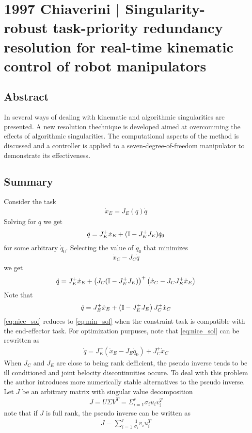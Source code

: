 \section{1997 Chiaverini | Singularity-robust task-priority redundancy resolution for real-time kinematic control of robot
manipulators}

\cite{chiaverini1997} 

\subsection{Abstract}

In \cite{chiaverini1997} several ways of dealing with kinematic and algorithmic singularities are presented. A new resolution thechnique is developed aimed at overcomming the effects of algorithmic singularities. The computational aspects of the method is discussed and a controller is applied to a seven-degree-of-freedom manipulator to demonstrate its effectiveness.

\subsection{Summary}

Consider the task
\begin{align}
    \dot x_E = J_E(q) \dot q
\end{align}
Solving for $q$ we get
\begin{align}
    \dot q = J_E^+ \dot x_E + (\mathbb{I} - J_E^+J_E)\dot q_0
\end{align}
for some arbitrary $\dot q_0$. Selecting the value of $\dot q_0$ that minimizes
\begin{align}
    \dot x_C - J_C \dot q
\end{align}
we get
\begin{align}
    \dot q = J_E^+ \dot x_E + \left(J_C(\mathbb{I} - J_E^+J_E)\right)^+ \left(\dot x_C - J_C J_E^+ \dot x_E\right) \label{eq:min_sol}
\end{align}
Note that
\begin{align}
    \dot q = J_E^+ \dot x_E + \left(\mathbb{I} - J_E^+J_E\right)J_C^+ \dot x_C \label{eq:nice_sol}
\end{align}
\autoref{eq:nice_sol} reduces to \autoref{eq:min_sol} when the constraint task is compatible with the end-effector task. For optimization purpuses, note that \autoref{eq:nice_sol} can be rewritten as
\begin{align}
    \dot q = J_E^+\left(\dot x_E - J_E \dot q_0\right) + J_C^+ \dot x_C
\end{align}
When $J_C$ and $J_E$ are close to being rank defficient, the pseudo inverse tends to be ill conditioned and joint belocity discontinuities occure. To deal with this problem the author introduces more numerically stable alternatives to the pseudo inverse. Let $J$ be an arbitrary matrix with singular value decomposition
\begin{align}
    J = U \Sigma V^T = \Sigma_{i=1}^r \sigma_i u_i v_i^T
\end{align}
note that if $J$ is full rank, the pseudo inverse can be written as
\begin{align}
    J = \sum_{i=1}^r \frac{1}{\sigma_i} v_i u_i^T
\end{align}

